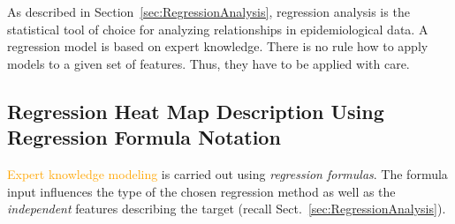 \documentclass[journal]{style/vgtc} 			          %
\newcommand{\design}[1]{\textcolor{orange}{#1}}
\begin{document}
As described in Section~\ref{sec:RegressionAnalysis}, regression analysis is the statistical tool of choice for analyzing relationships in epidemiological data.
A regression model is based on expert knowledge.
There is no rule how to apply models to a given set of features. Thus, they have to be applied with care.
\subsection{Regression Heat Map Description Using Regression Formula Notation}
\design{Expert knowledge modeling} is carried out using \emph{regression formulas}.
The formula input influences the type of the chosen regression method as well as the \emph{independent} features describing the target (recall Sect.~\ref{sec:RegressionAnalysis}).
\end{document}
